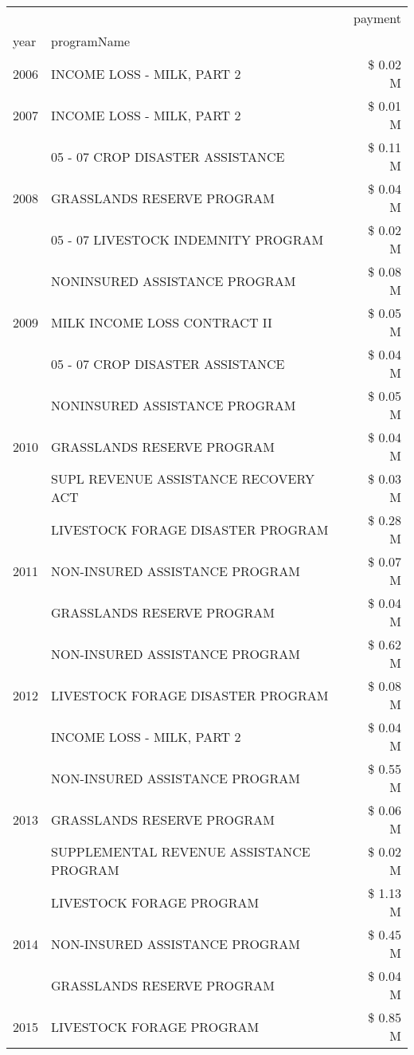 \begin{tabular}{llr}
\toprule
 &  & payment \\
year & programName &  \\
\midrule
2006 & INCOME LOSS - MILK, PART 2 & \$ 0.02 M \\
\cline{1-3}
2007 & INCOME LOSS - MILK, PART 2 & \$ 0.01 M \\
\cline{1-3}
\multirow[t]{3}{*}{2008} & 05 - 07 CROP DISASTER ASSISTANCE & \$ 0.11 M \\
 & GRASSLANDS RESERVE PROGRAM & \$ 0.04 M \\
 & 05 - 07 LIVESTOCK INDEMNITY PROGRAM & \$ 0.02 M \\
\cline{1-3}
\multirow[t]{3}{*}{2009} & NONINSURED ASSISTANCE PROGRAM & \$ 0.08 M \\
 & MILK INCOME LOSS CONTRACT II & \$ 0.05 M \\
 & 05 - 07 CROP DISASTER ASSISTANCE & \$ 0.04 M \\
\cline{1-3}
\multirow[t]{3}{*}{2010} & NONINSURED ASSISTANCE PROGRAM & \$ 0.05 M \\
 & GRASSLANDS RESERVE PROGRAM & \$ 0.04 M \\
 & SUPL REVENUE ASSISTANCE RECOVERY ACT & \$ 0.03 M \\
\cline{1-3}
\multirow[t]{3}{*}{2011} & LIVESTOCK FORAGE DISASTER PROGRAM & \$ 0.28 M \\
 & NON-INSURED ASSISTANCE PROGRAM & \$ 0.07 M \\
 & GRASSLANDS RESERVE PROGRAM & \$ 0.04 M \\
\cline{1-3}
\multirow[t]{3}{*}{2012} & NON-INSURED ASSISTANCE PROGRAM & \$ 0.62 M \\
 & LIVESTOCK FORAGE DISASTER PROGRAM & \$ 0.08 M \\
 & INCOME LOSS - MILK, PART 2 & \$ 0.04 M \\
\cline{1-3}
\multirow[t]{3}{*}{2013} & NON-INSURED ASSISTANCE PROGRAM & \$ 0.55 M \\
 & GRASSLANDS RESERVE PROGRAM & \$ 0.06 M \\
 & SUPPLEMENTAL REVENUE ASSISTANCE PROGRAM & \$ 0.02 M \\
\cline{1-3}
\multirow[t]{3}{*}{2014} & LIVESTOCK FORAGE PROGRAM & \$ 1.13 M \\
 & NON-INSURED ASSISTANCE PROGRAM & \$ 0.45 M \\
 & GRASSLANDS RESERVE PROGRAM & \$ 0.04 M \\
\cline{1-3}
\multirow[t]{3}{*}{2015} & LIVESTOCK FORAGE PROGRAM & \$ 0.85 M \\

\end{tabular}
